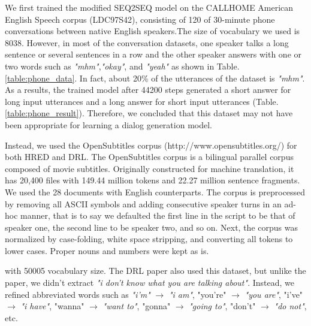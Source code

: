 We first trained the modified SEQ2SEQ model on the CALLHOME American English Speech corpus (LDC97S42), consisting of 120 of 30-minute phone conversations between native English speakers.The size of vocabulary we used is 8038. However, in most of the conversation datasets, one speaker talks a long sentence or several sentences in a row and the other speaker answers with one or two words such as \textit{"mhm"},\textit{"okay"}, and \textit{"yeah"} as shown in Table.\ref{table:phone_data}. In fact, about 20\% of the utterances of the dataset is \textit{"mhm"}. As a results, the trained model after 44200 steps generated a short answer for long input utterances and a long answer for short input utterances (Table.\ref{table:phone_result}). Therefore, we concluded that this dataset may not have been appropriate for learning a dialog generation model.

Instead, we used the OpenSubtitles corpus (http://www.opensubtitles.org/) for both HRED and DRL. The OpenSubtitles corpus is a bilingual parallel corpus composed of movie subtitles. Originally constructed for machine translation, it has 20,400 files with 149.44 million tokens and 22.27 million sentence fragments. We used the 28 documents with English counterparts. The corpus is preprocessed by removing all ASCII symbols and adding consecutive speaker turns in an ad-hoc manner, that is to say we defaulted the first line in the script to be that of speaker one, the second line to be speaker two, and so on. Next, the corpus was normalized by case-folding, white space stripping, and converting all tokens to lower cases. Proper nouns and numbers were kept as is. 

with 50005 vocabulary size. The DRL paper also used this dataset, but unlike the paper, we didn't extract \textit{"i don't know what you are talking about"}. Instead, we refined abbreviated words such as \textit{"i'm"} $\rightarrow$ \textit{"i am"}, {"you're"} $\rightarrow$ \textit{"you are"}, {"i've"} $\rightarrow$ \textit{"i have"}, {"wanna"} $\rightarrow$ \textit{"want to"}, {"gonna"} $\rightarrow$ \textit{"going to"}, {"don't"} $\rightarrow$ \textit{"do not"}, etc. 

